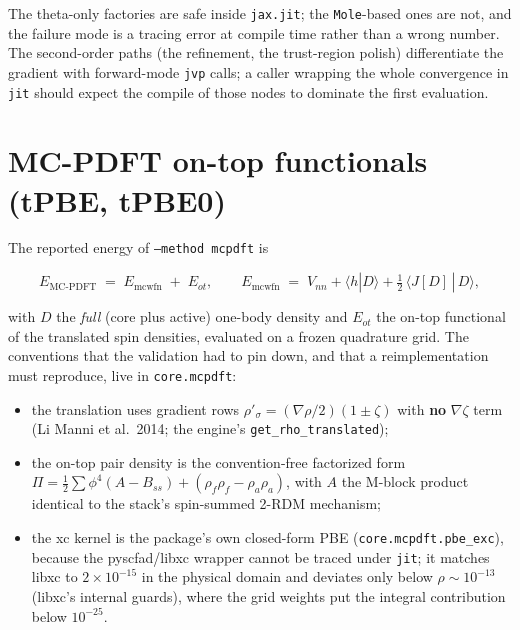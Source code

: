 The theta-only factories are safe inside \texttt{jax.jit}; the
\texttt{Mole}-based ones are not, and the failure mode is a tracing
error at compile time rather than a wrong number.  The second-order
paths (the refinement, the trust-region polish) differentiate the
gradient with forward-mode \texttt{jvp} calls; a caller wrapping the
whole convergence in \texttt{jit} should expect the compile of those
nodes to dominate the first evaluation.

\section{MC-PDFT on-top functionals (tPBE, tPBE0)}
\label{sec:protocol-mcpdft}

The reported energy of \texttt{--method mcpdft} is

\begin{equation}
E_{\mathrm{MC\text{-}PDFT}} \;=\; E_{\mathrm{mcwfn}} \;+\; E_{ot},
\qquad
E_{\mathrm{mcwfn}} \;=\; V_{nn} + \langle h | D \rangle
+ \tfrac{1}{2}\,\langle J[D] \,|\, D \rangle ,
\end{equation}

with $D$ the \emph{full} (core plus active) one-body density and
$E_{ot}$ the on-top functional of the translated spin densities,
evaluated on a frozen quadrature grid.  The conventions that the
validation had to pin down, and that a reimplementation must
reproduce, live in \texttt{core.mcpdft}:

\begin{itemize}
  \item the translation uses gradient rows
    $\rho'_{\sigma} = (\nabla\rho/2)(1 \pm \zeta)$ with \textbf{no}
    $\nabla\zeta$ term (Li Manni et al.\ 2014; the engine's
    \texttt{get\_rho\_translated});
  \item the on-top pair density is the convention-free factorized form
    $\Pi = \tfrac{1}{2}\sum \phi^4 (A - B_{ss})
    + (\rho_f\rho_f - \rho_a\rho_a)$, with $A$ the M-block product
    identical to the stack's spin-summed 2-RDM mechanism;
  \item the xc kernel is the package's own closed-form PBE
    (\texttt{core.mcpdft.pbe\_exc}), because the pyscfad/libxc wrapper
    cannot be traced under \texttt{jit}; it matches libxc to
    $2\times10^{-15}$ in the physical domain and deviates only below
    $\rho \sim 10^{-13}$ (libxc's internal guards), where the grid
    weights put the integral contribution below $10^{-25}$.
\end{itemize}

